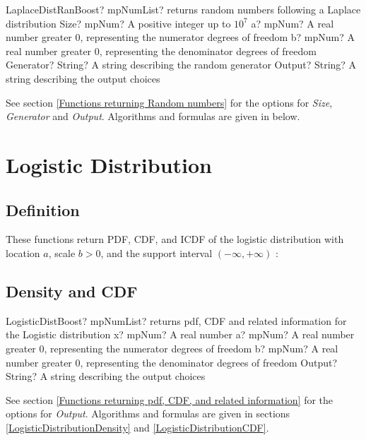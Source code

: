\begin{mpFunctionsExtract}
	\mpFunctionFive
	{LaplaceDistRanBoost? mpNumList? returns random numbers following a Laplace distribution}
	{Size? mpNum? A positive integer up to $10^7$}
	{a? mpNum? A real number greater 0, representing the numerator  degrees of freedom}
	{b? mpNum? A real number greater 0, representing the denominator degrees of freedom}
	{Generator? String? A string describing the random generator}
	{Output? String? A string describing the output choices}
\end{mpFunctionsExtract}

\vspace{0.3cm}

See section \ref{Functions returning Random numbers} for the options for  {\itshape\sffamily Size},  {\itshape\sffamily Generator} and {\itshape\sffamily Output}. Algorithms and formulas are given in below.





\section{Logistic Distribution}

\subsection{Definition}
These functions return PDF, CDF, and ICDF of the logistic distribution with location
$a$, scale $b > 0$, and the support interval $(-\infty,+\infty)$ :

\subsection{Density and CDF}
\begin{mpFunctionsExtract}
	\mpFunctionFour
	{LogisticDistBoost? mpNumList? returns pdf, CDF and related information for the Logistic distribution}
	{x? mpNum? A real number}
	{a? mpNum? A real number greater 0, representing the numerator  degrees of freedom}
	{b? mpNum? A real number greater 0, representing the denominator degrees of freedom}
	{Output? String? A string describing the output choices}
\end{mpFunctionsExtract}

\vspace{0.3cm}
See section \ref{Functions returning pdf, CDF, and related information} for the options for {\itshape\sffamily Output}. Algorithms and formulas are given in sections \ref{LogisticDistributionDensity} and \ref{LogisticDistributionCDF}.


